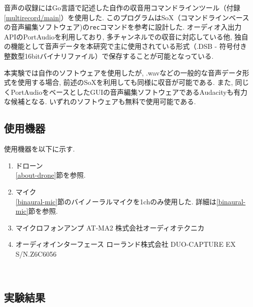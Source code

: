 音声の収録にはGo言語で記述した自作の収音用コマンドラインツール（付録\ref{multirecord/main}）を使用した. 
このプログラムはSoX（コマンドラインベースの音声編集ソフトウェア)\cite{sox:online}の\texttt{rec}コマンドを参考に設計した. 
オーディオ入出力APIのPortAudio\cite{portaudio:online}を利用しており, 多チャンネルでの収音に対応している他, 独自の機能として音声データを本研究で主に使用されている形式（.DSB - 符号付き整数型16bitバイナリファイル）で保存することが可能となっている. 

本実験では自作のソフトウェアを使用したが, .wavなどの一般的な音声データ形式を使用する場合, 前述のSoXを利用しても同様に収音が可能である. また, 同じくPortAudioをベースとしたGUIの音声編集ソフトウェアであるAudacity\cite{audacity:online}も有力な候補となる. いずれのソフトウェアも無料で使用可能である. 

\subsection{使用機器}\label{used-equipments-record}

使用機器を以下に示す. 

\begin{enumerate}
\renewcommand{\labelenumi}{(\arabic{enumi})}
\item
  ドローン\\
  \ref{about-drone}節を参照. 
\item
  マイク \\
  \ref{binaural-mic}節のバイノーラルマイクを1chのみ使用した. 詳細は\ref{binaural-mic}節を参照. 
\item
  マイクロフォンアンプ AT-MA2 株式会社オーディオテクニカ

\item
  オーディオインターフェース ローランド株式会社 DUO-CAPTURE EX S/N.Z6C6056
\end{enumerate}

\
\subsection{実験結果}\label{result-drone}

